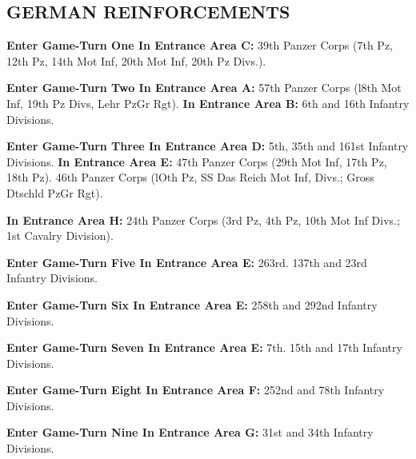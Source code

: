 \subsection{GERMAN REINFORCEMENTS}

\textbf{Enter Game-Turn One In Entrance Area C:}
39th Panzer Corps (7th Pz, 12th Pz, 14th Mot Inf,
20th Mot Inf, 20th Pz Divs.).

\textbf{Enter Game-Turn Two In Entrance Area A:}
57th Panzer Corps (l8th Mot Inf, 19th Pz Divs, Lehr PzGr Rgt).
\textbf{In Entrance Area B:}
6th and 16th Infantry Divisions.

\textbf{Enter Game-Turn Three In Entrance Area D:}
5th, 35th and 161st Infantry Divisions.
\textbf{In Entrance Area E:}
47th Panzer Corps (29th Mot Inf, 17th Pz, 18th Pz).
46th Panzer Corps (lOth Pz, SS Das Reich Mot Inf, Divs.; Gross Dtschld PzGr Rgt).

\textbf{In Entrance Area H:}
24th Panzer Corps (3rd Pz, 4th Pz, 10th Mot Inf Divs.; 1st Cavalry Division).

\textbf{Enter Game-Turn Five In Entrance Area E:}
263rd. 137th and 23rd Infantry Divisions.

\textbf{Enter Game-Turn Six In Entrance Area E:}
258th and 292nd Infantry Divisions.

\textbf{Enter Game-Turn Seven In Entrance Area E:}
7th. 15th and 17th Infantry Divisions.

\textbf{Enter Game-Turn Eight In Entrance Area F:}
252nd and 78th Infantry Divisions.

\textbf{Enter Game-Turn Nine In Entrance Area G:}
31st and 34th Infantry Divisions.
